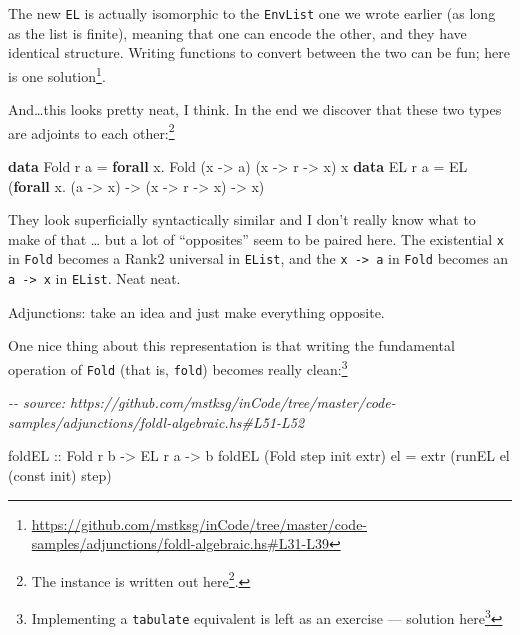 \documentclass[]{article}
\newenvironment{Shaded}{}{}
\newcommand{\CommentTok}[1]{\textcolor[rgb]{0.38,0.63,0.69}{\textit{#1}}}
\newcommand{\DataTypeTok}[1]{\textcolor[rgb]{0.56,0.13,0.00}{#1}}
\newcommand{\FunctionTok}[1]{\textcolor[rgb]{0.02,0.16,0.49}{#1}}
\newcommand{\KeywordTok}[1]{\textcolor[rgb]{0.00,0.44,0.13}{\textbf{#1}}}
\newcommand{\NormalTok}[1]{#1}
\newcommand{\OperatorTok}[1]{\textcolor[rgb]{0.40,0.40,0.40}{#1}}
\newcommand{\OtherTok}[1]{\textcolor[rgb]{0.00,0.44,0.13}{#1}}
\renewcommand{\href}[2]{#2\footnote{\url{#1}}}
\begin{document}
The new \texttt{EL} is actually isomorphic to the \texttt{EnvList} one we wrote
earlier (as long as the list is finite), meaning that one can encode the other,
and they have identical structure. Writing functions to convert between the two
can be fun;
\href{https://github.com/mstksg/inCode/tree/master/code-samples/adjunctions/foldl-algebraic.hs\#L31-L39}{here
is one solution}.

And\ldots this looks pretty neat, I think. In the end we discover that these two
types are adjoints to each other:\footnote{The instance is
  \href{https://github.com/mstksg/inCode/tree/master/code-samples/adjunctions/foldl-algebraic.hs\#L58-L71}{written
  out here}.}

\begin{Shaded}
\begin{Highlighting}[]
\KeywordTok{data} \DataTypeTok{Fold}\NormalTok{ r a }\OtherTok{=} \KeywordTok{forall}\NormalTok{ x}\OperatorTok{.} \DataTypeTok{Fold}\NormalTok{            (x }\OtherTok{{-}>}\NormalTok{ a)    (x }\OtherTok{{-}>}\NormalTok{ r }\OtherTok{{-}>}\NormalTok{ x)    x}
\KeywordTok{data} \DataTypeTok{EL}\NormalTok{   r a }\OtherTok{=}           \DataTypeTok{EL}\NormalTok{   (}\KeywordTok{forall}\NormalTok{ x}\OperatorTok{.}\NormalTok{ (a }\OtherTok{{-}>}\NormalTok{ x) }\OtherTok{{-}>}\NormalTok{ (x }\OtherTok{{-}>}\NormalTok{ r }\OtherTok{{-}>}\NormalTok{ x) }\OtherTok{{-}>}\NormalTok{ x)}
\end{Highlighting}
\end{Shaded}

They look superficially syntactically similar and I don't really know what to
make of that \ldots{} but a lot of ``opposites'' seem to be paired here. The
existential \texttt{x} in \texttt{Fold} becomes a Rank2 universal in
\texttt{EList}, and the \texttt{x\ -\textgreater{}\ a} in \texttt{Fold} becomes
an \texttt{a\ -\textgreater{}\ x} in \texttt{EList}. Neat neat.

Adjunctions: take an idea and just make everything opposite.

One nice thing about this representation is that writing the fundamental
operation of \texttt{Fold} (that is, \texttt{fold}) becomes really
clean:\footnote{Implementing a \texttt{tabulate} equivalent is left as an
  exercise ---
  \href{https://github.com/mstksg/inCode/tree/master/code-samples/adjunctions/foldl-algebraic.hs\#L54-L56}{solution
  here}}

\begin{Shaded}
\begin{Highlighting}[]
\CommentTok{{-}{-} source: https://github.com/mstksg/inCode/tree/master/code{-}samples/adjunctions/foldl{-}algebraic.hs\#L51{-}L52}

\OtherTok{foldEL ::} \DataTypeTok{Fold}\NormalTok{ r b }\OtherTok{{-}>} \DataTypeTok{EL}\NormalTok{ r a }\OtherTok{{-}>}\NormalTok{ b}
\NormalTok{foldEL (}\DataTypeTok{Fold}\NormalTok{ step }\FunctionTok{init}\NormalTok{ extr) el }\OtherTok{=}\NormalTok{ extr (runEL el (}\FunctionTok{const} \FunctionTok{init}\NormalTok{) step)}
\end{Highlighting}
\end{Shaded}
\end{document}
